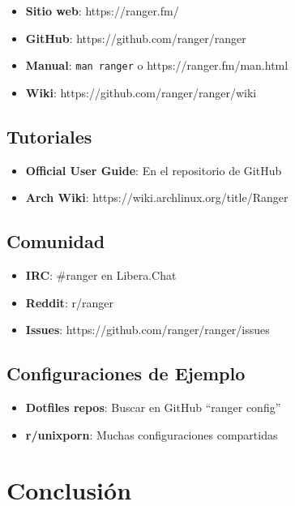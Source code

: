 \documentclass[
  doc,
  floatsintext,
  longtable,
  a4paper,
  nolmodern,
  notxfonts,
  notimes,
  12pt,
  colorlinks=true,linkcolor=blue,citecolor=blue,urlcolor=blue]{apa7}
\providecommand{\tightlist}{%
  \setlength{\itemsep}{0pt}\setlength{\parskip}{0pt}}
\begin{document}
\begin{itemize}
\tightlist
\item
  \textbf{Sitio web}: https://ranger.fm/
\item
  \textbf{GitHub}: https://github.com/ranger/ranger
\item
  \textbf{Manual}: \texttt{man\ ranger} o https://ranger.fm/man.html
\item
  \textbf{Wiki}: https://github.com/ranger/ranger/wiki
\end{itemize}

\subsection{Tutoriales}\label{tutoriales}

\begin{itemize}
\tightlist
\item
  \textbf{Official User Guide}: En el repositorio de GitHub
\item
  \textbf{Arch Wiki}: https://wiki.archlinux.org/title/Ranger
\end{itemize}

\subsection{Comunidad}\label{comunidad}

\begin{itemize}
\tightlist
\item
  \textbf{IRC}: \#ranger en Libera.Chat
\item
  \textbf{Reddit}: r/ranger
\item
  \textbf{Issues}: https://github.com/ranger/ranger/issues
\end{itemize}

\subsection{Configuraciones de
Ejemplo}\label{configuraciones-de-ejemplo}

\begin{itemize}
\tightlist
\item
  \textbf{Dotfiles repos}: Buscar en GitHub ``ranger config''
\item
  \textbf{r/unixporn}: Muchas configuraciones compartidas
\end{itemize}

\section{Conclusión}\label{conclusiuxf3n}
\end{document}
